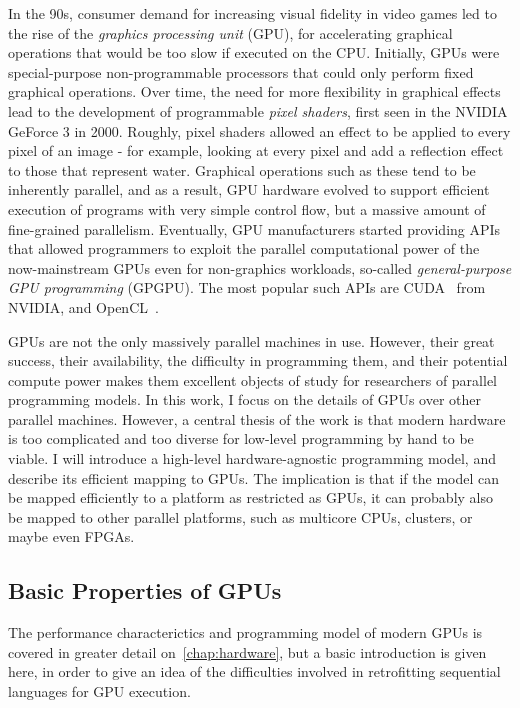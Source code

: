 In the 90s, consumer demand for increasing visual fidelity in video
games led to the rise of the \textit{graphics processing unit} (GPU),
for accelerating graphical operations that would be too slow if
executed on the CPU.  Initially, GPUs were special-purpose
non-programmable processors that could only perform fixed graphical
operations.  Over time, the need for more flexibility in graphical
effects lead to the development of programmable \textit{pixel
  shaders}, first seen in the NVIDIA GeForce 3 in 2000.  Roughly,
pixel shaders allowed an effect to be applied to every pixel of an
image - for example, looking at every pixel and add a reflection
effect to those that represent water.  Graphical operations such as
these tend to be inherently parallel, and as a result, GPU hardware
evolved to support efficient execution of programs with very simple
control flow, but a massive amount of fine-grained parallelism.
Eventually, GPU manufacturers started providing APIs that allowed
programmers to exploit the parallel computational power of the
now-mainstream GPUs even for non-graphics workloads, so-called
\textit{general-purpose GPU programming} (GPGPU).  The most popular
such APIs are CUDA~\cite{cuda} from NVIDIA, and
OpenCL~\cite{Stone:2010:OPP:622179.1803953}.

GPUs are not the only massively parallel machines in use.  However,
their great success, their availability, the difficulty in programming
them, and their potential compute power makes them excellent objects
of study for researchers of parallel programming models.  In this
work, I focus on the details of GPUs over other parallel machines.
However, a central thesis of the work is that modern hardware is too
complicated and too diverse for low-level programming by hand to be
viable.  I will introduce a high-level hardware-agnostic programming
model, and describe its efficient mapping to GPUs.  The implication is
that if the model can be mapped efficiently to a platform as
restricted as GPUs, it can probably also be mapped to other parallel
platforms, such as multicore CPUs, clusters, or maybe even FPGAs.

\subsection{Basic Properties of GPUs}

The performance characterictics and programming model of modern GPUs
is covered in greater detail on~\ref{chap:hardware}, but a basic
introduction is given here, in order to give an idea of the
difficulties involved in retrofitting sequential languages for GPU
execution.

